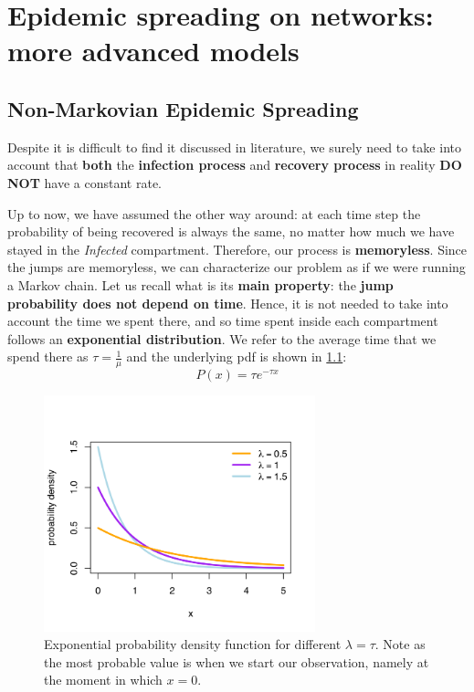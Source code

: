 \documentclass[../main/main.tex]{subfiles}
\begin{document}
\chapter{Epidemic spreading on networks: more advanced models}

\section{Non-Markovian Epidemic Spreading}

Despite it is difficult to find it discussed in literature, we surely need to take into account that \textbf{both} the \textbf{infection process} and \textbf{recovery process} in reality \textbf{DO NOT} have a constant rate. 

Up to now, we have assumed the other way around: at each time step the probability of being recovered is always the same, no matter how much we have stayed in the \textit{Infected} compartment. Therefore, our process is \textbf{memoryless}. Since the jumps are memoryless, we can characterize our problem as if we were running a Markov chain. Let us recall what is its \textbf{main property}: the \textbf{jump probability does not depend on time}. Hence, it is not needed to take into account the time we spent there, and so time spent inside each compartment follows an \textbf{exponential distribution}.
We refer to the average time that we spend there as \( \tau = \frac{1}{\mu }\) and the underlying pdf is shown in \ref{fig:09_2}:
\begin{equation*}
  P(x) = \tau e^{- \tau x}
\end{equation*}

\begin{figure}[h!]
\centering
\includegraphics[width=0.7\textwidth]{../lessons/image/09/image02.png}
\caption{\label{fig:09_2} Exponential probability density function for different $\lambda = \tau$. Note as the most probable value is when we start our observation, namely at the moment in which $x=0$. }
\end{figure}
\end{document}
